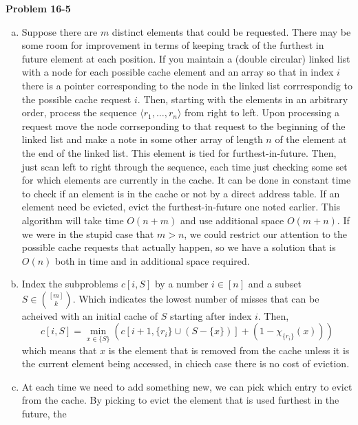 \documentclass{article}
\begin{document}
\noindent\textbf{Problem 16-5}\\
\begin{enumerate}[a.]
\item
Suppose there are $m$ distinct elements that could be requested. There may be some room for improvement in terms of keeping track of the furthest in future element at each position. If you maintain a (double circular) linked list with a node for each possible cache element and an array so that in index $i$ there is a pointer corresponding to the node in the linked list corrrespondig to the possible cache request $i$. Then, starting with the elements in an arbitrary order, process the sequence $\langle r_1,\ldots, r_n\rangle$ from right to left. Upon processing a request move the node corrseponding to that request to the beginning of the linked list and make a note in some other array of length $n$ of the element at the end of the linked list. This element is tied for furthest-in-future. Then, just scan left to right through the sequence, each time just checking some set for which elements are currently in the cache. It can be done in constant time to check if an element is in the cache or not by a direct address table. If an element need be evicted, evict the furthest-in-future one noted earlier. This algorithm will take time $O(n+m)$ and use additional space $O(m+n)$. If we were in the stupid case that $m>n$, we could restrict our attention to the possible cache requests that actually happen, so we have a solution that is $O(n)$ both in time and in additional space required.

\item
Index the subproblems $c[i,S]$ by a number $i\in [n]$ and a subset $S \in \binom{[m]}{k}$. Which indicates the lowest number of misses that can be acheived with an initial cache of $S$ starting after index $i$. Then, 
\[
c[i,S] = \min_{x\in\{S\}} (c[i+1,\{r_i\}\cup(S-\{x\})] + (1-\chi_{\{r_i\}}(x)) )
\]
which means that $x$ is the element that is removed from the cache unless it is the current element being accessed, in chiech case there is no cost of eviction.

\item
At each time we need to add something new, we can pick which entry to evict from the cache. By picking to evict the element that is used furthest in the future, the

\end{enumerate}
\end{document}
